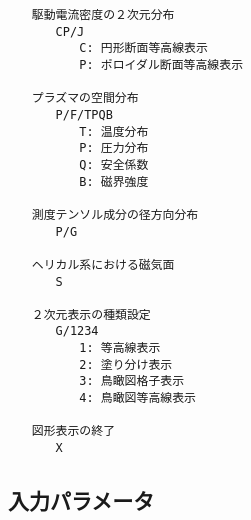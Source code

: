 \documentclass[11pt]{jarticle}
\begin{document}
\begin{verbatim}
　　駆動電流密度の２次元分布
　　　　CP/J
　　　　　　C: 円形断面等高線表示
　　　　　　P: ポロイダル断面等高線表示

　　プラズマの空間分布
　　　　P/F/TPQB
　　　　　　T: 温度分布
　　　　　　P: 圧力分布
　　　　　　Q: 安全係数
　　　　　　B: 磁界強度

　　測度テンソル成分の径方向分布
　　　　P/G

　　ヘリカル系における磁気面
　　　　S

　　２次元表示の種類設定
　　　　G/1234
　　　　　　1: 等高線表示
　　　　　　2: 塗り分け表示
　　　　　　3: 鳥瞰図格子表示
　　　　　　4: 鳥瞰図等高線表示

　　図形表示の終了
　　　　X
\end{verbatim}

\subsection{入力パラメータ}
\end{document}
